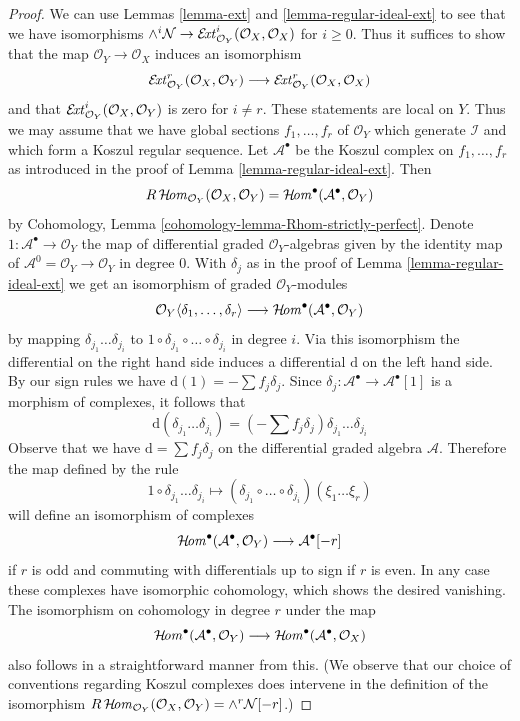 \begin{proof}
We can use Lemmas \ref{lemma-ext} and \ref{lemma-regular-ideal-ext}
to see that we have isomorphisms
$\wedge^i\mathcal{N} \to
\mathop{\mathcal{E}\!\mathit{xt}}\nolimits^i_{\mathcal{O}_Y}(\mathcal{O}_X, \mathcal{O}_X)$
for $i \geq 0$. Thus it suffices to show that the map
$\mathcal{O}_Y \to \mathcal{O}_X$ induces an isomorphism
$$
\mathop{\mathcal{E}\!\mathit{xt}}\nolimits^r_{\mathcal{O}_Y}(\mathcal{O}_X, \mathcal{O}_Y)
\longrightarrow
\mathop{\mathcal{E}\!\mathit{xt}}\nolimits^r_{\mathcal{O}_Y}(\mathcal{O}_X, \mathcal{O}_X)
$$
and that
$\mathop{\mathcal{E}\!\mathit{xt}}\nolimits^i_{\mathcal{O}_Y}(\mathcal{O}_X, \mathcal{O}_Y)$
is zero for $i \not = r$. These statements are local on $Y$. Thus
we may assume that we have global sections $f_1, \ldots, f_r$ of
$\mathcal{O}_Y$ which generate $\mathcal{I}$ and which form a
Koszul regular sequence. Let $\mathcal{A}^\bullet$
be the Koszul complex on $f_1, \ldots, f_r$ as introduced in the proof of
Lemma \ref{lemma-regular-ideal-ext}. Then
$$
R\mathop{\mathcal{H}\!\mathit{om}}\nolimits_{\mathcal{O}_Y}(\mathcal{O}_X, \mathcal{O}_Y) =
\mathop{\mathcal{H}\!\mathit{om}}\nolimits^\bullet(\mathcal{A}^\bullet, \mathcal{O}_Y)
$$
by Cohomology, Lemma \ref{cohomology-lemma-Rhom-strictly-perfect}.
Denote $1 : \mathcal{A}^\bullet \to \mathcal{O}_Y$ the map of differential
graded $\mathcal{O}_Y$-algebras given by the identity map of
$\mathcal{A}^0 = \mathcal{O}_Y \to \mathcal{O}_Y$ in degree $0$.
With $\delta_j$ as in the proof of Lemma \ref{lemma-regular-ideal-ext}
we get an isomorphism of graded $\mathcal{O}_Y$-modules
$$
\mathcal{O}_Y\langle \delta_1, \ldots, \delta_r\rangle
\longrightarrow
\mathop{\mathcal{H}\!\mathit{om}}\nolimits^\bullet(\mathcal{A}^\bullet, \mathcal{O}_Y)
$$
by mapping $\delta_{j_1} \ldots \delta_{j_i}$ to
$1 \circ \delta_{j_1} \circ \ldots \circ \delta_{j_i}$ in degree $i$.
Via this isomorphism the differential on the right hand side
induces a differential $\text{d}$ on the left hand side.
By our sign rules we have $\text{d}(1) = - \sum f_j \delta_j$.
Since $\delta_j : \mathcal{A}^\bullet \to \mathcal{A}^\bullet[1]$
is a morphism of complexes, it follows that
$$
\text{d}(\delta_{j_1} \ldots \delta_{j_i}) =
(- \sum f_j \delta_j )\delta_{j_1} \ldots \delta_{j_i}
$$
Observe that we have $\text{d} = \sum f_j \delta_j$ on the differential
graded algebra $\mathcal{A}$. Therefore the map defined by the rule
$$
1 \circ \delta_{j_1} \ldots \delta_{j_i} \longmapsto
(\delta_{j_1} \circ \ldots \circ \delta_{j_i})(\xi_1 \ldots \xi_r)
$$
will define an isomorphism of complexes
$$
\mathop{\mathcal{H}\!\mathit{om}}\nolimits^\bullet(\mathcal{A}^\bullet, \mathcal{O}_Y)
\longrightarrow \mathcal{A}^\bullet[-r]
$$
if $r$ is odd and commuting with differentials up to sign if $r$ is even.
In any case these complexes have isomorphic cohomology, which shows the
desired vanishing. The isomorphism on cohomology in degree $r$
under the map
$$
\mathop{\mathcal{H}\!\mathit{om}}\nolimits^\bullet(\mathcal{A}^\bullet, \mathcal{O}_Y)
\longrightarrow
\mathop{\mathcal{H}\!\mathit{om}}\nolimits^\bullet(\mathcal{A}^\bullet, \mathcal{O}_X)
$$
also follows in a straightforward manner from this.
(We observe that our choice of conventions regarding
Koszul complexes does intervene in the definition
of the isomorphism
$R\mathop{\mathcal{H}\!\mathit{om}}\nolimits_{\mathcal{O}_Y}(\mathcal{O}_X, \mathcal{O}_Y) =
\wedge^r \mathcal{N}[-r]$.)
\end{proof}


